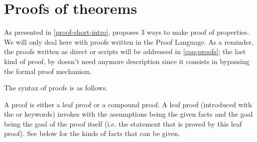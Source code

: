 
\section{Proofs of theorems}

As presented in \ref{proof-short-intro}, {\focal} proposes 3 ways to
make proof of properties. We will only deal here with proofs written
in the {\focal} Proof Language. As a reminder, the proofs written as
direct {\coq} or {\dedukti} scripts will be addressed in \ref{coq-proofs}; the
last kind of proof, by  doesn't need anymore description
since it consists in bypassing the formal proof mechanism.

The syntax of proofs is as follows.
\label{zenon-and-dependencies}
\begin{syn}
 \is
      
\alt {} 
\alt {}
\alt {}  
\alt {}  
\end{syn}

\begin{syn}
 \is
\end{syn}

\begin{syn}
 \is
\alt {}  
\alt {}  
\end{syn}




A proof is either a leaf proof or a compound proof. A leaf proof
(introduced with the  or  keywords)
invokes {\zenon} with the
assumptions being the given facts and the goal being the goal of the
proof itself (i.e. the statement that is proved by this leaf proof).
See below for the kinds of facts that can be given.

